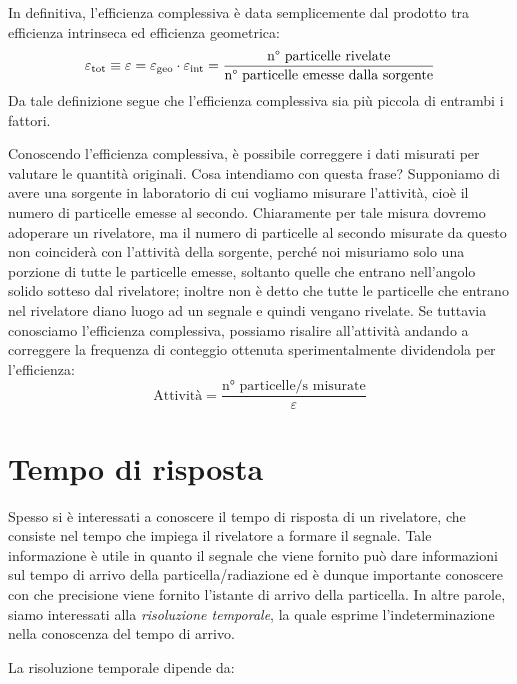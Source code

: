 In definitiva, l'efficienza complessiva è data semplicemente dal prodotto tra efficienza intrinseca ed efficienza geometrica:
\begin{equation*}
   \varepsilon_{\rm tot}
   \equiv \varepsilon
   =\varepsilon_{\rm geo} \cdot \varepsilon_{\rm int}
   =\frac{\text{n° particelle rivelate}}{\text{n° particelle emesse dalla sorgente}}
\end{equation*}
Da tale definizione segue che l'efficienza complessiva sia più piccola di entrambi i fattori.

\begin{esempio}
   Conoscendo l'efficienza complessiva, è possibile correggere i dati misurati per valutare le quantità originali. Cosa intendiamo con questa frase? Supponiamo di avere una sorgente in laboratorio di cui vogliamo misurare l'attività, cioè il numero di particelle emesse al secondo. Chiaramente per tale misura dovremo adoperare un rivelatore, ma il numero di particelle al secondo misurate da questo non coinciderà con l'attività della sorgente, perché noi misuriamo solo una porzione di tutte le particelle emesse, soltanto quelle che entrano nell'angolo solido sotteso dal rivelatore; inoltre non è detto che tutte le particelle che entrano nel rivelatore diano luogo ad un segnale e quindi vengano rivelate. Se tuttavia conosciamo l'efficienza complessiva, possiamo risalire all'attività andando a correggere la frequenza di conteggio ottenuta sperimentalmente dividendola per l'efficienza:
   \begin{equation*}
      \text{Attività}=\frac{\text{n° particelle/s misurate}}{\varepsilon}
   \end{equation*}
\end{esempio}

\section{Tempo di risposta}
Spesso si è interessati a conoscere il tempo di risposta di un rivelatore, che consiste nel tempo che impiega il rivelatore a formare il segnale. Tale informazione è utile in quanto il segnale che viene fornito può dare informazioni sul tempo di arrivo della particella/radiazione ed è dunque importante conoscere con che precisione viene fornito l'istante di arrivo della particella. In altre parole, siamo interessati alla \textit{risoluzione temporale}, la quale esprime l'indeterminazione nella conoscenza del tempo di arrivo.

La risoluzione temporale dipende da:

